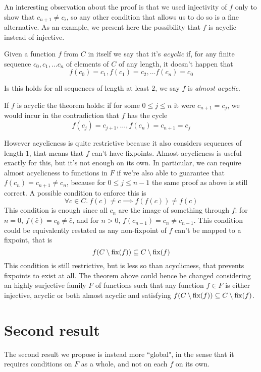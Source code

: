 \todo{}
An interesting observation about the proof is that we used injectivity of $f$ only to show that $c_{n+1} \neq c_i$, so any other condition that allows us to do so is a fine alternative. As an example, we present here the possibility that $f$ is acyclic instead of injective.
\begin{definition}
	Given a function $f$ from $C$ in itself we say that it's \textit{acyclic} if, for any finite sequence $c_0, c_1, \dots c_n$ of elements of $C$ of any length, it doesn't happen that
	\[
	f(c_0) = c_1, f(c_1) = c_2, \dots f(c_n) = c_0
	\]

	Is this holds for all sequences of length at least $2$, we say $f$ is \textit{almost acyclic}.
\end{definition}
If $f$ is acyclic the theorem holds: if for some $0 \le j \le n$ it were $c_{n+1} = c_j$, we would incur in the contradiction that $f$ has the cycle
\[
f(c_j) = c_{j+1}, \dots, f(c_n) = c_{n+1} = c_j
\]

However acyclicness is quite restrictive because it also considers sequences of length $1$, that means that $f$ can't have fixpoints. Almost acyclicness is useful exactly for this, but it's not enough on its own.
In particular, we can require almost acyclicness to functions in $F$ if we're also able to guarantee that $f(c_n) = c_{n+1} \neq c_n$, because for $0 \le j \le n - 1$ the same proof as above is still correct. A possible condition to enforce this is
\[
\forall c \in C.\ f(c) \neq c \implies f(f(c)) \neq f(c)
\]
This condition is enough since all $c_n$ are the image of something through $f$: for $n = 0$, $f(\bar{c})= c_0 \neq \bar{c}$, and for $n > 0$, $f(c_{n-1}) = c_n \neq c_{n-1}$.
This condition could be equivalently restated as any non-fixpoint of $f$ can't be mapped to a fixpoint, that is
\[
f(C \setminus \text{fix}(f)) \subseteq C \setminus \text{fix}(f)
\]
This condition is still restrictive, but is less so than acyclicness, that prevents fixpoints to exist at all.
The theorem above could hence be changed considering an highly surjective family $F$ of functions such that any function $f \in F$ is either injective, acyclic or both almost acyclic and satisfying $f(C \setminus \text{fix}(f)) \subseteq C \setminus \text{fix}(f)$.



\section{Second result}
The second result we propose is instead more ``global", in the sense that it requires conditions on $F$ as a whole, and not on each $f$ on its own.

